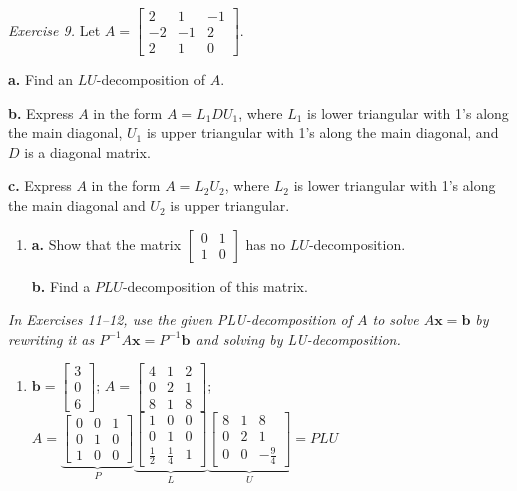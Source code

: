 \documentclass{article}
\begin{document}
\noindent\textit{Exercise 9.} Let
$A = \begin{bmatrix}2&1&-1\\-2&-1&2\\2&1&0\end{bmatrix}$.

\textbf{a.} Find an $LU$-decomposition of $A$.

\textbf{b.} Express $A$ in the form $A = L_1 D U_1$, where $L_1$ is lower triangular
with 1's along the main diagonal, $U_1$ is upper triangular with 1's along the main
diagonal, and $D$ is a diagonal matrix.

\textbf{c.} Express $A$ in the form $A = L_2 U_2$, where $L_2$ is lower triangular
with 1's along the main diagonal and $U_2$ is upper triangular.

\begin{enumerate}
  \item[10.] \textbf{a.} Show that the matrix
        $\begin{bmatrix}0&1\\1&0\end{bmatrix}$ has no $LU$-decomposition.

        \textbf{b.} Find a $PLU$-decomposition of this matrix.

\end{enumerate}

\noindent\textit{In Exercises 11--12, use the given PLU-decomposition of $A$ to solve
$A\mathbf{x}=\mathbf{b}$ by rewriting it as $P^{-1}A\mathbf{x}=P^{-1}\mathbf{b}$
and solving by LU-decomposition.}

\begin{enumerate}
  \item[12.] $\mathbf{b} = \begin{bmatrix}3\\0\\6\end{bmatrix}$;\quad
        $A = \begin{bmatrix}4&1&2\\0&2&1\\8&1&8\end{bmatrix}$;\quad
        $A = \underbrace{\begin{bmatrix}0&0&1\\0&1&0\\1&0&0\end{bmatrix}}_{P}
             \underbrace{\begin{bmatrix}1&0&0\\0&1&0\\\frac{1}{2}&\frac{1}{4}&1\end{bmatrix}}_{L}
             \underbrace{\begin{bmatrix}8&1&8\\0&2&1\\0&0&-\frac{9}{4}\end{bmatrix}}_{U} = PLU$

\end{enumerate}
\end{document}

